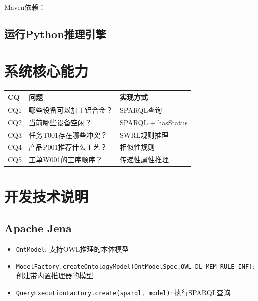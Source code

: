 Maven依赖：
\begin{codebox}
\end{codebox}

\begin{codebox}
\end{codebox}

\subsection{运行Python推理引擎}
\begin{codebox}
\end{codebox}

\section{系统核心能力}

\begin{center}
\begin{tabular}{@{}lll@{}}
\toprule
\textbf{CQ} & \textbf{问题} & \textbf{实现方式} \\
\midrule
CQ1 & 哪些设备可以加工铝合金？ & SPARQL查询 \\
CQ2 & 当前哪些设备空闲？ & SPARQL + hasStatus \\
CQ3 & 任务T001存在哪些冲突？ & SWRL规则推理 \\
CQ4 & 产品P001推荐什么工艺？ & 相似性规则 \\
CQ5 & 工单W001的工序顺序？ & 传递性属性推理 \\
\bottomrule
\end{tabular}
\end{center}

\section{开发技术说明}

\subsection{Apache Jena}
\begin{itemize}
\item \texttt{OntModel}: 支持OWL推理的本体模型
\item \texttt{ModelFactory.createOntologyModel(OntModelSpec.OWL\_DL\_MEM\_RULE\_INF)}: 创建带内置推理器的模型
\item \texttt{QueryExecutionFactory.create(sparql, model)}: 执行SPARQL查询
\end{itemize}

